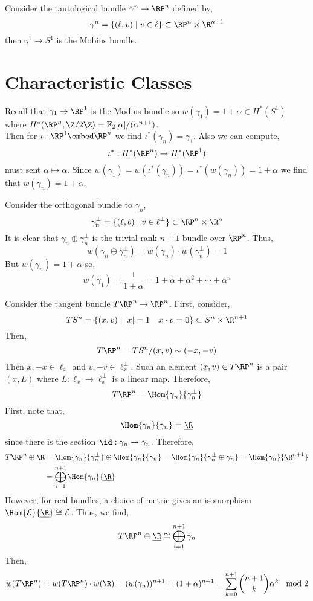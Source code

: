 \documentclass[12pt]{extarticle}
\begin{document}
\begin{example}
Consider the tautological bundle $\gamma^n \to \RP^n$ defined by,
\[ \gamma^n = \{ (\ell, v) \mid v \in \ell \} \subset \RP^n \times \R^{n+1} \]
then $\gamma^1 \to S^1$ is the Mobius bundle. 
\end{example}

\section{Characteristic Classes}

\begin{example}
Recall that $\gamma_1 \to \RP^1$ is the Modius bundle so $w(\gamma_1) = 1 + \alpha \in H^*(S^1)$ where $H^*(\RP^n, \Z / 2 \Z) = \mathbb{F}_2[\alpha]/(\alpha^{n+1})$. 
\bigskip\\
Then for $\iota : \RP^1 \embed \RP^n$ we find $\iota^*(\gamma_n) = \gamma_1$. Also we can compute,
\[ \iota^* : H^*(\RP^n) \to H^*(\RP^1) \]
must sent $\alpha \mapsto \alpha$. Since $w(\gamma_1) = w(\iota^*(\gamma_n)) = \iota^*(w(\gamma_n)) = 1 + \alpha$ we find that $w(\gamma_n) = 1 + \alpha$. 
\end{example}

\begin{example}
Consider the orthogonal bundle to $\gamma_n$,
\[ \gamma_n^\perp = \{ (\ell, b) \mid v \in \ell^\perp \} \subset \RP^n \times \R^n \]
It is clear that $\gamma_n \oplus \gamma_n^\perp$ is the trivial rank-$n+1$ bundle over $\RP^n$. Thus, 
\[ w(\gamma_n \oplus \gamma_n^\perp) = w(\gamma_n) \cdot w(\gamma_n^\perp) = 1 \]
But $w(\gamma_n) = 1 + \alpha$ so,
\[ w(\gamma_1) = \frac{1}{1 + \alpha} = 1 + \alpha + \alpha^2 + \cdots + \alpha^n \]
\end{example}

\begin{example}
Consider the tangent bundle $T \RP^n \to \RP^n$. First, consider,
\[ T S^n = \{ (x, v) \mid |x| = 1 \quad x \cdot v = 0 \} \subset S^n \times \R^{n+1} \]
Then,
\[ T \RP^n = T S^n / (x, v) \sim (-x, -v) \]
Then $x,-x \in \ell_x$ and $v, -v \in \ell_x^\perp$. Such an element $(x, v) \in T \RP^n$ is a pair $(x, L)$ where $L : \ell_x \to \ell_x^\perp$ is a linear map. Therefore,
\[ T \RP^n = \Hom{\gamma_n}{\gamma_n^\perp} \]
First, note that,
\[ \Hom{\gamma_n}{\gamma_n} = \underline{\R} \]
since there is the section $\id : \gamma_n \to \gamma_n$. Therefore,
\begin{align*}
T \RP^n \oplus \underline{\R} & = \Hom{\gamma_n}{\gamma_n^\perp} \oplus \Hom{\gamma_n}{\gamma_n} = \Hom{\gamma_n}{\gamma_n^\perp \oplus \gamma_n} = \Hom{\gamma_n}{\underline{\R}^{n+1}} 
\\
& = \bigoplus_{i = 1}^{n+1} \Hom{\gamma_n}{\underline{\R}}
\end{align*} 
However, for real bundles, a choice of metric gives an isomorphism $\Hom{\E}{\underline{\R}} \cong \E$. Thus, we find,
\[ T \RP^n \oplus \underline{\R} \cong \bigoplus_{i = 1}^{n+1} \gamma_n \]
Then,
\[ w( T \RP^n) = w( T \RP^n) \cdot w(\R) = (w(\gamma_n))^{n+1} = (1 + \alpha)^{n+1} = \sum_{k = 0}^{n+1} { n + 1 \choose k } \alpha^k \: \mod 2 \]
\end{example}
\end{document}
